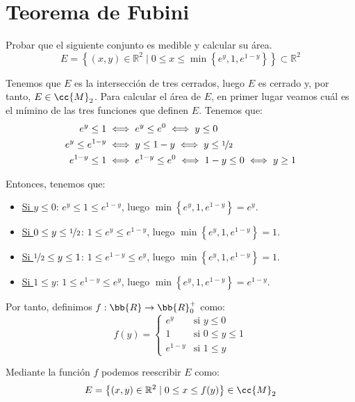 \section{Teorema de Fubini}

\begin{ejercicio}
    Probar que el siguiente conjunto es medible y calcular su área.
    \[ E = \left\{ (x, y) \in \mathbb{R}^2 \mid 0 \leq x \leq \min \left\{ e^y , 1 , e^{1-y} \right\} \right\} \subset \mathbb{R}^2 \]

    Tenemos que $E$ es la intersección de tres cerrados, luego $E$ es cerrado y, por tanto, $E\in \cc{M}_2$.
    Para calcular el área de $E$, en primer lugar veamos cuál es el mímino de las tres funciones que definen $E$.
    Tenemos que:
    \begin{align*}
        e^y \leq 1 &\iff e^y \leq e^0 \iff y \leq 0 \\
        e^y \leq e^{1-y} &\iff y \leq 1-y \iff y \leq \nicefrac{1}{2} \\
        e^{1-y} \leq 1 &\iff e^{1-y} \leq e^0 \iff 1-y \leq 0 \iff y \geq 1
    \end{align*}

    Entonces, tenemos que:
    \begin{itemize}
        \item \ul{Si $y \leq 0$}: $e^y \leq 1\leq e^{1-y}$, luego $\min \left\{ e^y , 1 , e^{1-y} \right\} = e^y$.
        \item \ul{Si $0 \leq y \leq \nicefrac{1}{2}$}: $1\leq e^y \leq e^{1-y}$, luego $\min \left\{ e^y , 1 , e^{1-y} \right\} = 1$.
        \item \ul{Si $\nicefrac{1}{2} \leq y \leq 1$}: $1\leq e^{1-y} \leq e^y$, luego $\min \left\{ e^y , 1 , e^{1-y} \right\} = 1$.
        \item \ul{Si $1\leq y$}: $1\leq e^{1-y} \leq e^{y}$, luego $\min \left\{ e^y , 1 , e^{1-y} \right\} = e^{1-y}$.
    \end{itemize}

    Por tanto, definimos $f:\bb{R} \to \bb{R}_0^+$ como:
    \[ f(y) = \begin{cases}
        e^y & \text{si } y \leq 0 \\
        1 & \text{si } 0 \leq y \leq 1 \\
        e^{1-y} & \text{si } 1 \leq y
    \end{cases} \]

    Mediante la función $f$ podemos reescribir $E$ como:
    \[ E = \left\{ (x, y) \in \mathbb{R}^2 \mid 0 \leq x \leq f(y) \right\}\in \cc{M}_2 \]


\end{ejercicio}
